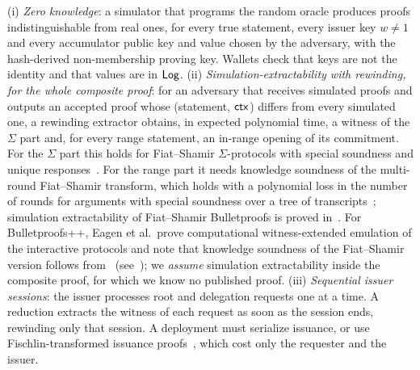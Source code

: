 \begin{assumption}[Extraction]\label{as:se}
(i) \emph{Zero knowledge}: a simulator that programs the random oracle produces proofs indistinguishable from real ones, for every true statement, every issuer key $w\neq1$ and every accumulator public key and value chosen by the adversary, with the hash-derived non-membership proving key. Wallets check that keys are not the identity and that values are in $\mathsf{Log}$.
(ii) \emph{Simulation-extractability with rewinding, for the whole composite proof}: for an adversary that receives simulated proofs and outputs an accepted proof whose (statement, $\mathsf{ctx}$) differs from every simulated one, a rewinding extractor obtains, in expected polynomial time, a witness of the $\Sigma$ part and, for every range statement, an in-range opening of its commitment. For the $\Sigma$ part this holds for Fiat--Shamir $\Sigma$-protocols with special soundness and unique responses~\cite{faust2012fsnm}. For the range part it needs knowledge soundness of the multi-round Fiat--Shamir transform, which holds with a polynomial loss in the number of rounds for arguments with special soundness over a tree of transcripts~\cite{attema2022fsmulti}; simulation extractability of Fiat--Shamir Bulletproofs is proved in~\cite{ganesh2022bpse,dao2023bpse}. For Bulletproofs++, Eagen et al.\ prove computational witness-extended emulation of the interactive protocols and note that knowledge soundness of the Fiat--Shamir version follows from~\cite{attema2022fsmulti} (see~\cite{eagen2024bpp}); we \emph{assume} simulation extractability inside the composite proof, for which we know no published proof.
(iii) \emph{Sequential issuer sessions}: the issuer processes root and delegation requests one at a time. A reduction extracts the witness of each request as soon as the session ends, rewinding only that session. A deployment must serialize issuance, or use Fischlin-transformed issuance proofs~\cite{fischlin2005online}, which cost only the requester and the issuer.
\end{assumption}

